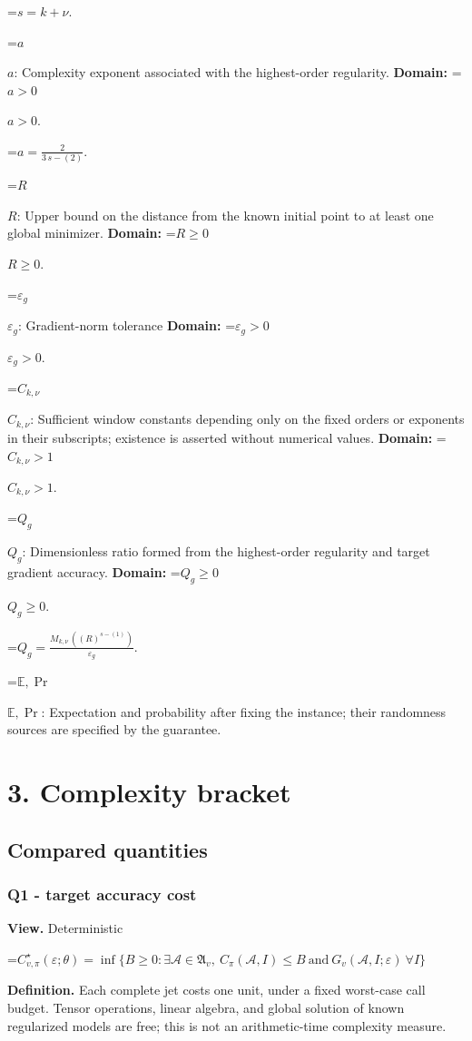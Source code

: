 \documentclass[10pt,a4paper]{article}
\newcommand{\AtlasMath}[1]{\par\begingroup\centering\setbox0=\hbox{$\displaystyle #1$}\ifdim\wd0>1.4\linewidth\typeout{ATLAS WIDE FORMULA: \the\wd0}\fi\ifdim\wd0>\linewidth\resizebox{\linewidth}{!}{\box0}\else\box0\fi\par\endgroup}
\newcommand{\AtlasInlineMath}[1]{\begingroup\setbox0=\hbox{$#1$}\ifdim\wd0>.4\linewidth\endgroup\AtlasMath{#1}\else\endgroup$#1$\fi}
\begin{document}
\AtlasMath{s=k+\nu.}


\AtlasInlineMath{a}: Complexity exponent associated with the highest-order regularity. \textbf{Domain:} \AtlasInlineMath{a>0}.


\AtlasMath{a=\frac{2}{3\,s-(2)}.}


\AtlasInlineMath{R}: Upper bound on the distance from the known initial point to at least one global minimizer. \textbf{Domain:} \AtlasInlineMath{R\ge0}.

\AtlasInlineMath{\varepsilon_g}: Gradient-norm tolerance \textbf{Domain:} \AtlasInlineMath{\varepsilon_g>0}.

\AtlasInlineMath{C_{k,\nu}}: Sufficient window constants depending only on the fixed orders or exponents in their subscripts; existence is asserted without numerical values. \textbf{Domain:} \AtlasInlineMath{C_{k,\nu}>1}.

\AtlasInlineMath{Q_g}: Dimensionless ratio formed from the highest-order regularity and target gradient accuracy. \textbf{Domain:} \AtlasInlineMath{Q_g\ge0}.


\AtlasMath{Q_g=\frac{M_{k,\nu}\,((R)^{s-(1)})}{\varepsilon_g}.}


\AtlasInlineMath{\mathbb{E},\Pr}: Expectation and probability after fixing the instance; their randomness sources are specified by the guarantee.

\section{3. Complexity bracket}
\subsection{Compared quantities}
\subsubsection{Q1 - target accuracy cost}
\textbf{View.} Deterministic

\AtlasMath{C^\star_{v,\pi}(\varepsilon;\theta)=\inf\{B\ge0:\exists\mathcal A\in\mathfrak A_v,\ C_\pi(\mathcal A,I)\le B\ \text{and}\ G_v(\mathcal A,I;\varepsilon)\ \forall I\}}
\textbf{Definition.} Each complete jet costs one unit, under a fixed worst-case call budget. Tensor operations, linear algebra, and global solution of known regularized models are free; this is not an arithmetic-time complexity measure.
\end{document}
